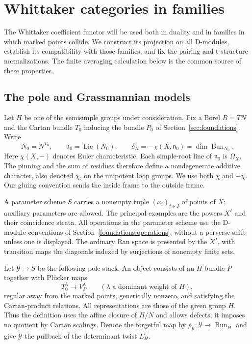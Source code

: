 \section{Whittaker categories in families}\label{sec:whittaker}

The Whittaker coefficient functor will be used both in duality and in
families in which marked points collide. We construct its projection on
all D-modules, establish its compatibility with those families, and fix the
pairing and t-structure normalizations. The finite averaging calculation
below is the common source of these properties.

\subsection{The pole and Grassmannian models}

Let $H$ be one of the semisimple groups under consideration. Fix a Borel
$B=TN$ and the Cartan bundle $T_0$ inducing the bundle $P_0$ of
Section~\ref{sec:foundations}. Write
\[
 N_0=N^{T_0},\qquad \mathfrak n_0=\operatorname{Lie}(N_0),\qquad
 \delta_N=-\chi(X,\mathfrak n_0)=\dim\operatorname{Bun}_{N_0}.
\]
Here $\chi(X,-)$ denotes Euler characteristic. Each simple-root line of
$\mathfrak n_0$ is $\Omega_X$. The pinning and the sum of residues therefore
define a nondegenerate additive character, also denoted $\chi$, on the
unipotent loop groups. We use both $\chi$ and $-\chi$. Our gluing convention
sends the inside frame to the outside frame.

A parameter scheme $S$ carries a nonempty tuple $(x_i)_{i\in I}$ of points
of $X$; auxiliary parameters are allowed. The principal examples are the
powers $X^I$ and their coincidence strata. All operations in the parameter
scheme use the D-module conventions of Section~\ref{foundations:operations},
without a perverse shift unless one is displayed. The ordinary Ran space
is presented by the $X^I$, with transition maps the diagonals indexed by
surjections of nonempty finite sets.

Let $\mathcal Y\to S$ be the following pole stack. An object consists of an
$H$-bundle $P$ together with Pl\"ucker maps
\[
 T_0^\lambda\longrightarrow V_P^\lambda
 \qquad(\lambda\text{ a dominant weight of }H),
\]
regular away from the marked points, generically nonzero, and satisfying
the Cartan-product relations. All representations are those of the given
group $H$. Thus the definition uses the affine closure of $H/N$ and allows
defects; it imposes no quotient by Cartan scalings. Denote the forgetful map
by $p_{\mathcal Y}:\mathcal Y\to\operatorname{Bun}_H$ and give $\mathcal Y$
the pullback of the determinant twist $L_H^s$.

